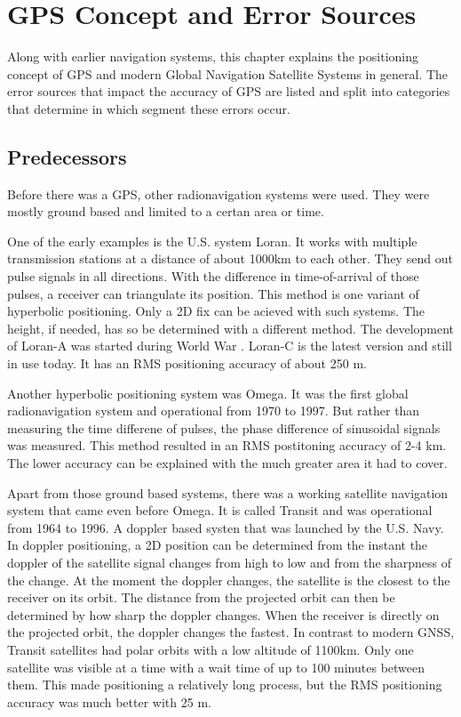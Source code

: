 \chapter{GPS Concept and Error Sources}\label{ch:GPS_concept}

Along with earlier navigation systems, this chapter explains the positioning concept of GPS and modern Global Navigation Satellite Systems in general.
The error sources that impact the accuracy of GPS are listed and split into categories that determine in which segment these errors occur.


\section{Predecessors}
Before there was a GPS, other radionavigation systems were used.
They were mostly ground based and limited to a certan area or time.

One of the early examples is the U.S. system Loran.
It works with multiple transmission stations at a distance of about 1000km to each other.
They send out pulse signals in all directions.
With the difference in time-of-arrival of those pulses, a receiver can triangulate its position.
This method is one variant of hyperbolic positioning.
Only a 2D fix can be acieved with such systems.
The height, if needed, has so be determined with a different method.
The development of Loran-A was started during World War .
Loran-C is the latest version and still in use today.
It has an RMS positioning accuracy of about 250 m.

Another hyperbolic positioning system was Omega.
It was the first global radionavigation system and operational from 1970 to 1997.
But rather than measuring the time differene of pulses, the phase difference of sinusoidal signals was measured.
This method resulted in an RMS postitoning accuracy of 2-4 km.
The lower accuracy can be explained with the much greater area it had to cover.

Apart from those ground based systems, there was a working satellite navigation system that came even before Omega.
It is called Transit and was operational from 1964 to 1996.
A doppler based systen that was launched by the U.S. Navy.
In doppler positioning, a 2D position can be determined from the instant the doppler of the satellite signal changes from high to low and from the sharpness of the change.
At the moment the doppler changes, the satellite is the closest to the receiver on its orbit.
The distance from the projected orbit can then be determined by how sharp the doppler changes.
When the receiver is directly on the projected orbit, the doppler changes the fastest.
In contrast to modern GNSS, Transit satellites had polar orbits with a low altitude of 1100km.
Only one satellite was visible at a time with a wait time of up to 100 minutes between them.
This made positioning a relatively long process, but the RMS positioning accuracy was much better with 25 m.

